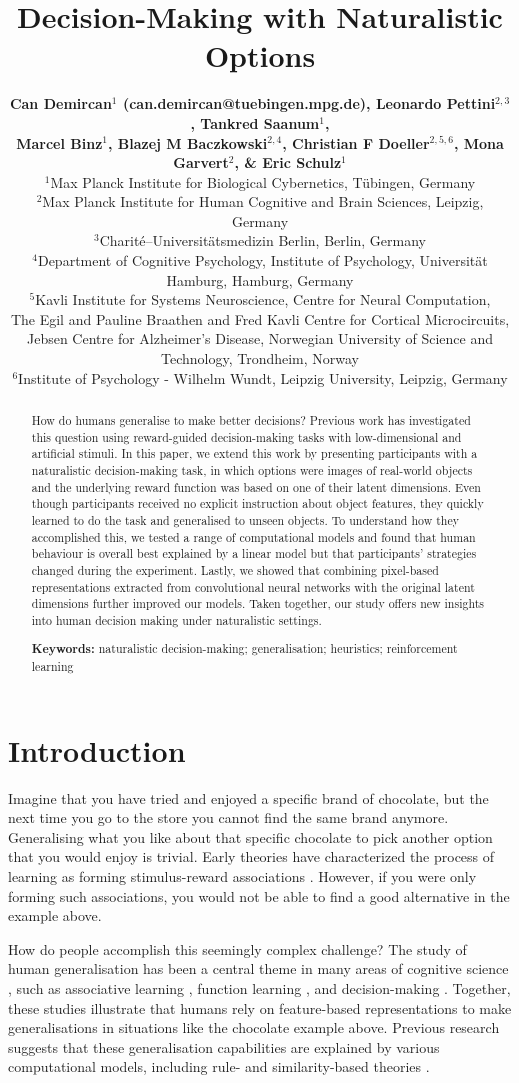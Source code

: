 \documentclass[10pt]{article}
\title{Decision-Making with Naturalistic Options\vspace{-0.4cm}}
\author{{\large \bf Can Demircan$^{1}$ (can.demircan@tuebingen.mpg.de), Leonardo Pettini$^{2,3}$, Tankred Saanum$^{1}$,} \\ {{\large \bf Marcel Binz$^{1}$, Blazej M Baczkowski$^{2,4}$, Christian F Doeller$^{2,5,6}$, Mona Garvert$^{2}$, \& \large \bf Eric Schulz$^1$}}
\\
$^1$Max Planck Institute for Biological Cybernetics, Tübingen, Germany 
\\
$^2$Max Planck Institute for Human Cognitive and Brain Sciences, Leipzig, Germany 
\\
$^3$Charité–Universitätsmedizin Berlin, Berlin, Germany
\\
$^4$Department of Cognitive Psychology, Institute of Psychology, Universität Hamburg, Hamburg, Germany
\\
$^5$Kavli Institute for Systems Neuroscience, Centre for Neural Computation, 
\\
The Egil and Pauline Braathen and Fred Kavli Centre for Cortical Microcircuits, \\
Jebsen Centre for Alzheimer’s Disease, Norwegian University of Science and Technology, Trondheim, Norway
\\
$^6$Institute of Psychology - Wilhelm Wundt, Leipzig University, Leipzig, Germany
}
\begin{document}
\maketitle

\begin{abstract}

How do humans generalise to make better decisions? Previous work has investigated this question using reward-guided decision-making tasks with low-dimensional and artificial stimuli. In this paper, we extend this work by presenting participants with a naturalistic decision-making task, in which options were images of real-world objects and the underlying reward function was based on one of their latent dimensions. Even though participants received no explicit instruction about object features, they quickly learned to do the task and generalised to unseen objects. To understand how they accomplished this, we tested a range of computational models and found that human behaviour is overall best explained by a linear model but that participants' strategies changed during the experiment. Lastly, we showed that combining pixel-based representations extracted from convolutional neural networks with the original latent dimensions further improved our models. Taken together, our study offers new insights into human decision making under naturalistic settings.
    
\textbf{Keywords:} 
naturalistic decision-making; generalisation; heuristics; reinforcement learning
\end{abstract}

\section{Introduction}

Imagine that you have tried and enjoyed a specific brand of chocolate, but the next time you go to the store you cannot find the same brand anymore. Generalising what you like about that specific chocolate to pick another option that you would enjoy is trivial. Early theories have characterized the process of learning as forming stimulus-reward associations \citep{rescorla_theory_1972}. However, if you were only forming such associations, you would not be able to find a good alternative in the example above. 

How do people accomplish this seemingly complex challenge? The study of human generalisation has been a central theme in many areas of cognitive science \citep{shepard_generalisation}, such as associative learning \citep{shanks1998feature}, function learning \citep{schulz2017compositional}, and decision-making \citep{stojic_human_2015, schulz_finding_2020, saanum2021compositional,garvert_hippocampal_2021}. Together, these studies illustrate that humans rely on feature-based representations to make generalisations in situations like the chocolate example above. Previous research suggests that these generalisation capabilities are explained by various computational models, including rule- and similarity-based theories \citep{shanks1998feature, lucas2015rational}.
\end{document}

